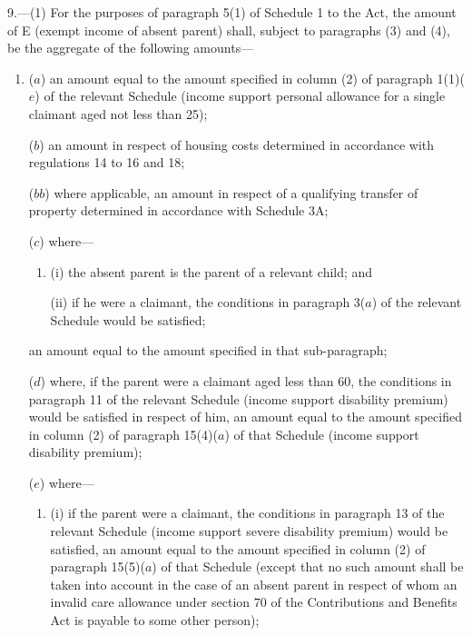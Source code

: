 \documentclass[12pt,a4paper]{article}
\begin{document}
9.—(1) For the purposes of paragraph 5(1) of Schedule 1 to the Act, the amount of E (exempt income of absent parent) shall, subject to paragraphs (3) and (4), be the aggregate of the following amounts—
\begin{enumerate}\item[]
($a$) an amount equal to the amount specified in column (2) of paragraph 1(1)($e$) of the relevant Schedule (income support personal allowance for a single claimant aged not less than 25);

($b$) an amount in respect of housing costs determined in accordance with regulations 14 to 
16 and 18;  %

($bb$) where applicable, an amount in respect of a qualifying transfer of property determined in accordance with Schedule 3A;

($c$) where—
\begin{enumerate}\item[]
(i) the absent parent is the parent of a relevant child; and


(ii) if he were a claimant, the conditions in paragraph 3($a$) of the relevant Schedule would be satisfied;
\end{enumerate}
an amount equal to the amount specified in 
that sub-paragraph;  %

($d$) where, if the parent were a claimant aged less than 60, the conditions in paragraph 11 of the relevant Schedule (income support disability premium) would be satisfied in respect of him, an amount equal to the amount specified in column (2) of paragraph 15(4)($a$) of that Schedule (income support disability premium);

($e$) where—
\begin{enumerate}\item[]
(i) if the parent were a claimant, the conditions in paragraph 13 of the relevant Schedule (income support severe disability premium) would be satisfied, an amount equal to the amount specified in column (2) of paragraph 15(5)($a$) of that Schedule (except that no such amount shall be taken into account in the case of an absent parent in respect of whom an invalid care allowance under section 70 of the Contributions and Benefits Act is payable to some other person);


\end{enumerate}
\end{enumerate}
\end{document}
